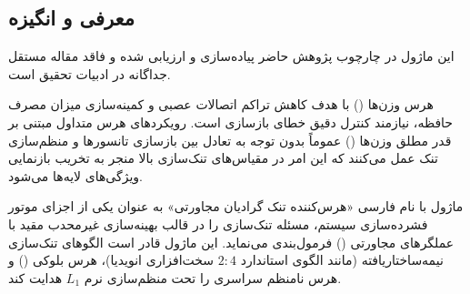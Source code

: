\subsection{معرفی و انگیزه}
این ماژول در چارچوب پژوهش حاضر پیاده‌سازی و ارزیابی شده و فاقد مقاله مستقل جداگانه در ادبیات تحقیق است.

هرس وزن‌ها () با هدف کاهش تراکم اتصالات عصبی و کمینه‌سازی میزان مصرف حافظه، نیازمند کنترل دقیق خطای بازسازی است. رویکردهای هرس متداول مبتنی بر قدر مطلق وزن‌ها () عموماً بدون توجه به تعادل بین بازسازی تانسورها و منظم‌سازی تنک عمل می‌کنند که این امر در مقیاس‌های تنک‌سازی بالا منجر به تخریب بازنمایی ویژگی‌های لایه‌ها می‌شود.

ماژول  با نام فارسی «هرس‌کننده تنک گرادیان مجاورتی» به عنوان یکی از اجزای موتور فشرده‌سازی سیستم، مسئله تنک‌سازی را در قالب بهینه‌سازی غیرمحدب مقید با عملگرهای مجاورتی () فرمول‌بندی می‌نماید. این ماژول قادر است الگوهای تنک‌سازی نیمه‌ساختاریافته  (مانند الگوی استاندارد $2:4$ سخت‌افزاری انویدیا)، هرس بلوکی () و هرس نامنظم سراسری را تحت منظم‌سازی نرم $L_1$ هدایت کند.
